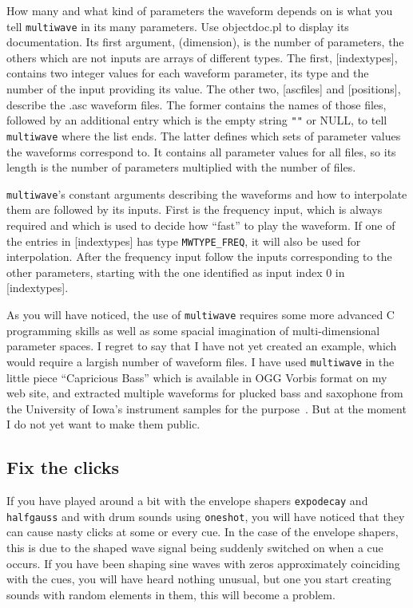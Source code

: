 \documentclass{article}
\begin{document}
How many and what kind of parameters the waveform depends on is what you tell
{\tt multiwave} in its many parameters.  Use objectdoc.pl to display its
documentation.  Its first argument, (dimension), is the number of parameters,
the others which are not inputs are arrays of different types.  The first,
[indextypes], contains two integer values for each waveform parameter, its type
and the number of the input providing its value.  The other two, [ascfiles] and
[positions], describe the .asc waveform files.  The former contains the names
of those files, followed by an additional entry which is the empty string
{\tt""} or NULL, to tell {\tt multiwave} where the list ends.  The latter
defines which sets of parameter values the waveforms correspond to.  It
contains all parameter values for all files, so its length is the number of
parameters multiplied with the number of files.

{\tt multiwave}'s constant arguments describing the waveforms and how to
interpolate them are followed by its inputs.  First is the frequency input,
which is always required and which is used to decide how ``fast'' to play the
waveform.  If one of the entries in [indextypes] has type {\tt MWTYPE\_FREQ},
it will also be used for interpolation.  After the frequency input follow the
inputs corresponding to the other parameters, starting with the one identified
as input index 0 in [indextypes].

As you will have noticed, the use of {\tt multiwave} requires some more
advanced C programming skills as well as some spacial imagination of
multi-dimensional parameter spaces.  I regret to say that I have not yet
created an example, which would require a largish number of waveform files.  I
have used {\tt multiwave} in the little piece ``Capricious Bass'' which is
available in OGG Vorbis format on my web site, and extracted multiple waveforms
for plucked bass and saxophone from the University of Iowa's instrument samples
for the purpose~\cite{iow}.  But at the moment I do not yet want to make them
public.


\subsection{Fix the clicks}
\label{sec:clicks}

If you have played around a bit with the envelope shapers {\tt expodecay} and
{\tt halfgauss} and with drum sounds using {\tt oneshot}, you will have noticed
that they can cause nasty clicks at some or every cue.  In the case of the
envelope shapers, this is due to the shaped wave signal being suddenly switched
on when a cue occurs.  If you have been shaping sine waves with zeros
approximately coinciding with the cues, you will have heard nothing unusual,
but one you start creating sounds with random elements in them, this will
become a problem.
\end{document}
